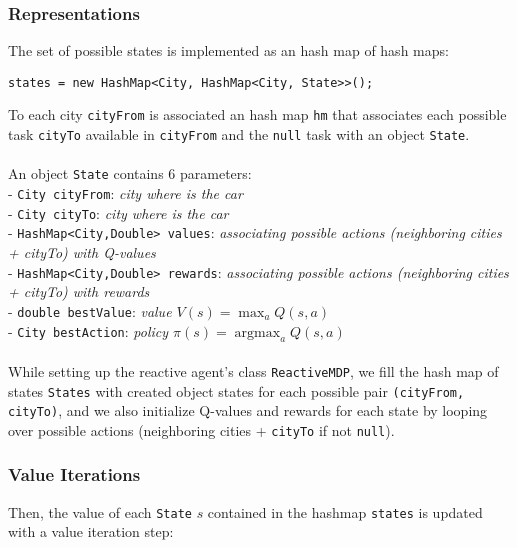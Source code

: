 \documentclass[11pt]{article}
\DeclareMathOperator*{\argmax}{argmax}
\begin{document}
\subsubsection{Representations}
The set of possible states is implemented as an hash map of hash maps:
\begin{verbatim}
states = new HashMap<City, HashMap<City, State>>();
\end{verbatim}
To each city \verb|cityFrom| is associated an hash map \verb|hm| that associates each possible task \verb|cityTo| available in \verb|cityFrom| and the \verb|null| task with an object \verb|State|.\\
\\
An object \verb|State| contains 6 parameters:\\
- \verb|City cityFrom|: \small{\textit{city where is the car}}\\
- \verb|City cityTo|: \small{\textit{city where is the car}}\\
- \verb|HashMap<City,Double> values|: \small{\textit{associating possible actions (neighboring cities + cityTo) with Q-values}}\\
- \verb|HashMap<City,Double> rewards|: \small{\textit{associating possible actions (neighboring cities + cityTo) with rewards}}\\
- \verb|double bestValue|: \small{\textit{value $V(s) = \max_a Q(s,a)$}}\\
- \verb|City bestAction|: \small{\textit{policy $\pi(s) = \argmax_a Q(s,a)$}}\\
\\
While setting up the reactive agent's class \verb|ReactiveMDP|, we fill the hash map of states \verb|States| with created object states for each possible pair \verb|(cityFrom, cityTo)|, and we also initialize Q-values and rewards for each state by looping over possible actions (neighboring cities + \verb|cityTo| if not \verb|null|).

\subsubsection{Value Iterations}
Then, the value of each \verb|State| $s$ contained in the hashmap \verb|states| is updated with a value iteration step:\\
\end{document}
